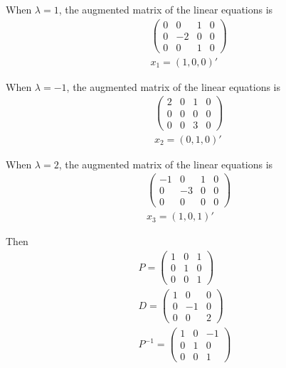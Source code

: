 \documentclass[letterpaper, 11pt]{article}
\newcommand{\1}{\mathds{1}}	%
\theoremstyle{definition}
\begin{document}
When $\lambda = 1$, the augmented matrix of the linear equations is \begin{align*}
    &\left(\begin{array}{ccc|c}
        0 & 0 & 1 & 0 \\
        0 & -2 & 0 & 0 \\
        0 & 0 & 1 & 0
    \end{array}\right) \\
    &x_{1} = (1,0,0)'
\end{align*}

When $\lambda=-1$, the augmented matrix of the linear equations is \begin{align*}
   &\left(\begin{array}{ccc|c}
        2 & 0 & 1 & 0 \\
        0 & 0 & 0 & 0 \\
        0 & 0 & 3 & 0
    \end{array}\right) \\
    &x_{2} = (0,1,0)'
\end{align*}

When $\lambda=2$, the augmented matrix of the linear equations is \begin{align*}
    &\left(\begin{array}{ccc|c}
        -1 & 0 & 1 & 0 \\
        0 & -3 & 0 & 0 \\
        0 & 0 & 0 & 0
    \end{array}\right) \\
    &x_{3} = (1,0,1)'
\end{align*}

Then \begin{align*}
    P = \begin{pmatrix}
        1 & 0 & 1 \\
        0 & 1 & 0 \\
        0 & 0 & 1
    \end{pmatrix} \\
    D = \begin{pmatrix}
        1 & 0 & 0 \\
        0 & -1 & 0 \\
        0 & 0 & 2
    \end{pmatrix} \\
    P ^{-1} = \begin{pmatrix}
        1 & 0 & -1 \\
        0 & 1 & 0 \\
        0 & 0 & 1
    \end{pmatrix}
\end{align*}
\end{document}
